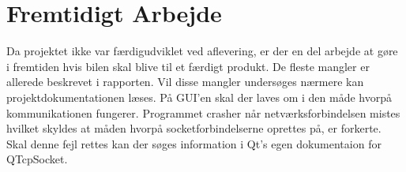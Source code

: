 \chapter{Fremtidigt Arbejde} \label{ch:Fremtidigt_arbejde}

Da projektet ikke var færdigudviklet ved aflevering, er der en del arbejde at gøre i fremtiden hvis bilen skal blive til et færdigt produkt. De fleste mangler er allerede beskrevet i rapporten. Vil disse mangler undersøges nærmere kan projektdokumentationen læses. På GUI'en skal der laves om i den måde hvorpå kommunikationen fungerer. Programmet crasher når netværksforbindelsen mistes hvilket skyldes at måden hvorpå socketforbindelserne oprettes på, er forkerte. Skal denne fejl rettes kan der søges information i Qt's egen dokumentaion for QTcpSocket. \cite{lib:qtcpsocket}   